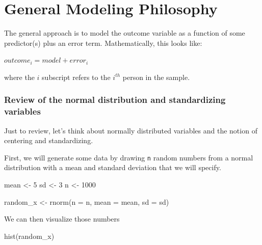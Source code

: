 \documentclass[
]{book}
\newenvironment{Shaded}{\begin{snugshade}}{\end{snugshade}}
\newcommand{\AttributeTok}[1]{\textcolor[rgb]{0.77,0.63,0.00}{#1}}
\newcommand{\DecValTok}[1]{\textcolor[rgb]{0.00,0.00,0.81}{#1}}
\newcommand{\FunctionTok}[1]{\textcolor[rgb]{0.00,0.00,0.00}{#1}}
\newcommand{\NormalTok}[1]{#1}
\newcommand{\OtherTok}[1]{\textcolor[rgb]{0.56,0.35,0.01}{#1}}
\begin{document}
\hypertarget{general-modeling-philosophy}{%
\section{General Modeling Philosophy}\label{general-modeling-philosophy}}

The general approach is to model the outcome variable as a function of some predictor(s) plus an error term. Mathematically, this looks like:

\(outcome_i = model + error_i\)

where the \(i\) subscript refers to the \(i^{th}\) person in the sample.

\hypertarget{review-of-the-normal-distribution-and-standardizing-variables}{%
\subsubsection{Review of the normal distribution and standardizing variables}\label{review-of-the-normal-distribution-and-standardizing-variables}}

Just to review, let's think about normally distributed variables and the notion of centering and standardizing.

First, we will generate some data by drawing \texttt{n} random numbers from a normal distribution with a mean and standard deviation that we will specify.

\begin{Shaded}
\begin{Highlighting}[]
\NormalTok{mean }\OtherTok{\textless{}{-}} \DecValTok{5}
\NormalTok{sd }\OtherTok{\textless{}{-}} \DecValTok{3}
\NormalTok{n }\OtherTok{\textless{}{-}} \DecValTok{1000}

\NormalTok{random\_x }\OtherTok{\textless{}{-}} \FunctionTok{rnorm}\NormalTok{(}\AttributeTok{n =}\NormalTok{ n, }\AttributeTok{mean =}\NormalTok{ mean, }\AttributeTok{sd =}\NormalTok{ sd)}
\end{Highlighting}
\end{Shaded}

We can then visualize those numbers

\begin{Shaded}
\begin{Highlighting}[]
\FunctionTok{hist}\NormalTok{(random\_x)}
\end{Highlighting}
\end{Shaded}
\end{document}
